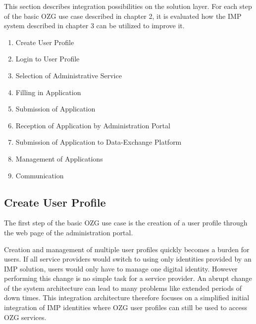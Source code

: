 This section describes integration possibilities on the solution layer. For each step of the basic OZG use case described in chapter 2, it is evaluated how the IMP system described in chapter 3 can be utilized to improve it. 

\begin{enumerate}
    \item{Create User Profile}
    \item{Login to User Profile}
    \item{Selection of Administrative Service}
    \item{Filling in Application}
    \item{Submission of Application}
    \item{Reception of Application by Administration Portal}
    \item{Submission of Application to Data-Exchange Platform}
    \item{Management of Applications}
    \item{Communication}
\end{enumerate}

\subsection{Create User Profile}

The first step of the basic OZG use case is the creation of a user profile through the web page of the administration portal.

Creation and management of multiple user profiles quickly becomes a burden for users. If all service providers would switch to using only identities provided by an IMP solution, users would only have to manage one digital identity. However performing this change is no simple task for a service provider. An abrupt change of the system architecture can lead to many problems like extended periods of down times. This integration architecture therefore focuses on a simplified initial integration of IMP identities where OZG user profiles can still be used to access OZG services.


